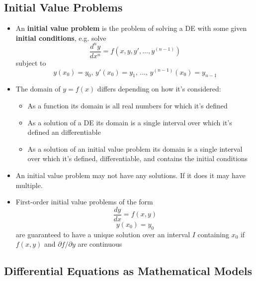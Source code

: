 \documentclass{article}
\begin{document}
\subsection{Initial Value Problems}

\begin{itemize}
  \item An \textbf{initial value problem} is the problem of solving a DE with some given \textbf{initial conditions}, e.g. solve \[\frac{d^n y}{dx^n} = f(x, y, y', \ldots, y^{(n - 1)})\] subject to \[y(x_0) = y_0, \,y'(x_0) = y_1, \,\ldots, \,y^{(n - 1)}(x_0) = y_{n - 1}\]

  \item The domain of $y = f(x)$ differs depending on how it's considered:

        \begin{itemize}
          \item As a function its domain is all real numbers for which it's defined

          \item As a solution of a DE its domain is a single interval over which it's defined an differentiable

          \item As a solution of an initial value problem its domain is a single interval over which it's defined, differentiable, and contains the initial conditions
        \end{itemize}

  \item An initial value problem may not have any solutions. If it does it may have multiple.

  \item First-order initial value problems of the form \[\frac{dy}{dx} = f(x, y)\] \[y(x_0) = y_0\] are guaranteed to have a unique solution over an interval $I$ containing $x_0$ if $f(x, y)$ and $\partial f / \partial y$ are continuous
\end{itemize}

\subsection{Differential Equations as Mathematical Models}
\end{document}

